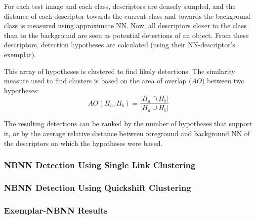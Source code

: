 For each test image and each class, descriptors are densely sampled, and the distance of each descriptor towards the current class and towards the background class is measured using approximate NN. Now, all descriptors closer to the class than to the background are seen as potential detections of an object. From these descriptors, detection hypotheses are calculated (using their NN-descriptor's exemplar).

This array of hypotheses is clustered to find likely detections. The similarity measure used to find clusters is based on the area of overlap ($AO$) between two hypotheses:
\begin{equation}
    AO(H_a, H_b)= \frac{|H_a\cap H_b|}{|H_a\cup H_b|}
\end{equation}

The resulting detections can be ranked by the number of hypotheses that support it, or by the average relative distance between foreground and background NN of the descriptors on which the hypotheses were based.

\subsubsection{NBNN Detection Using Single Link Clustering} %
\label{sub:nbnn_detection_using_single_link_clustering}



\subsubsection{NBNN Detection Using Quickshift Clustering} %
\label{sub:nbnn_detection_using_quickshift_clustering}



\subsubsection{Exemplar-NBNN Results} %
\label{sub:exemplar_nbnn_results}
\begin{figure}[hbt]
    \centering
\end{figure}

